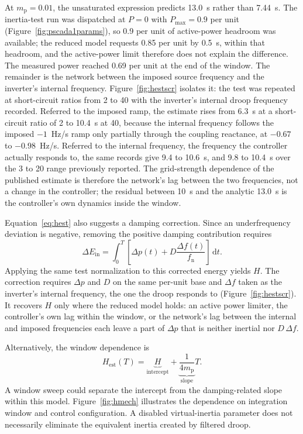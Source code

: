 \documentclass[11pt]{article}
\begin{document}
At $m_{\mathrm{p}}=0.01$, the unsaturated expression predicts 13.0~s rather than 7.44~s. The inertia-test run was dispatched at $P=0$ with $P_{\max}=0.9$ per unit (Figure~\ref{fig:pscada1params}), so 0.9 per unit of active-power headroom was available; the reduced model requests 0.85 per unit by 0.5~s, within that headroom, and the active-power limit therefore does not explain the difference. The measured power reached 0.69 per unit at the end of the window. The remainder is the network between the imposed source frequency and the inverter's internal frequency. Figure~\ref{fig:hestscr} isolates it: the test was repeated at short-circuit ratios from 2 to 40 with the inverter's internal droop frequency recorded. Referred to the imposed ramp, the estimate rises from 6.3~s at a short-circuit ratio of 2 to 10.4~s at 40, because the internal frequency follows the imposed $-1$~Hz/s ramp only partially through the coupling reactance, at $-0.67$ to $-0.98$~Hz/s. Referred to the internal frequency, the frequency the controller actually responds to, the same records give 9.4 to 10.6~s, and 9.8 to 10.4~s over the 3 to 20 range previously reported. The grid-strength dependence of the published estimate is therefore the network's lag between the two frequencies, not a change in the controller; the residual between 10~s and the analytic 13.0~s is the controller's own dynamics inside the window.

Equation~\eqref{eq:hest} also suggests a damping correction. Since an underfrequency deviation is negative, removing the positive damping contribution requires
\begin{equation}
\Delta E_{\mathrm{in}}=\int_0^T\left[\Delta p(t)+D\frac{\Delta f(t)}{f_{\mathrm{n}}}\right]\,\mathrm{d}t.
\label{eq:subtract}
\end{equation}
Applying the same test normalization to this corrected energy yields $H$. The correction requires $\Delta p$ and $D$ on the same per-unit base and $\Delta f$ taken as the inverter's internal frequency, the one the droop responds to (Figure~\ref{fig:hestscr}). It recovers $H$ only where the reduced model holds: an active power limiter, the controller's own lag within the window, or the network's lag between the internal and imposed frequencies each leave a part of $\Delta p$ that is neither inertial nor $D\,\Delta f$.

Alternatively, the window dependence is
\begin{equation}
H_{\mathrm{est}}(T)=\underbrace{H}_{\text{intercept}}+
\underbrace{\frac{1}{4m_{\mathrm{p}}}}_{\text{slope}}T.
\label{eq:multiT}
\end{equation}
A window sweep could separate the intercept from the damping-related slope within this model. Figure~\ref{fig:hmech} illustrates the dependence on integration window and control configuration. A disabled virtual-inertia parameter does not necessarily eliminate the equivalent inertia created by filtered droop.
\end{document}
